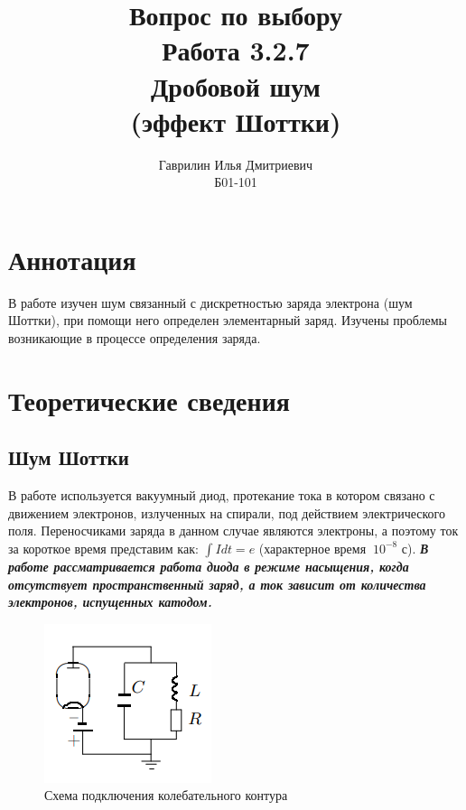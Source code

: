 \documentclass[a4paper, 12pt]{article}%
\author{Гаврилин Илья Дмитриевич \\
	Б01-101}
\title{\textbf{Вопрос по выбору \\
			   Работа 3.2.7 \\ 
		       Дробовой шум \\ (эффект Шоттки)}}
\begin{document}
	\maketitle
	\section*{Аннотация}
	В работе изучен шум связанный с дискретностью заряда электрона (шум Шоттки), при помощи него определен элементарный заряд. Изучены проблемы возникающие в процессе определения заряда.
	\section{Теоретические сведения}
	 \subsection{Шум Шоттки}
	 В работе используется вакуумный диод, протекание тока в котором связано с движением электронов, излученных на спирали, под действием электрического поля. Переносчиками заряда в данном случае являются электроны, а поэтому ток за короткое время представим как: $\int Idt=e$ (характерное время $~10^{-8}$ с). \textbf{\textit{В работе рассматривается работа диода в режиме насыщения, когда отсутствует пространственный заряд, а ток зависит от количества электронов, испущенных катодом.}}\\
	 \begin{figure}
	 	\centering
	 	\includegraphics[width=0.8\linewidth]{установка}
	 	\caption{Схема подключения колебательного контура}
	 \end{figure}
	 
\end{document}
